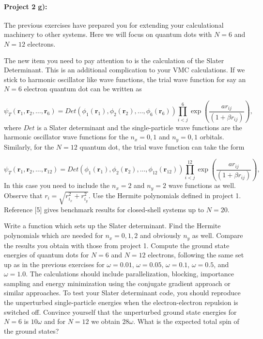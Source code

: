 \documentclass[%
oneside,                 %
final,                   %
10pt]{article}
\begin{document}
\paragraph{Project 2 g):}
The previous exercises have prepared you for extending your calculational machinery  to other systems.
Here we will focus on quantum dots with $N=6$ and $N=12$ electrons.

The new item you need to pay attention to is the calculation of the Slater Determinant. This is an additional complication
to your VMC calculations.  
If we stick to harmonic oscillator like wave functions,
the trial wave function for say an $N=6$ electron quantum dot can be written as

\begin{equation}
   \psi_{T}(\bm{r}_1,\bm{r}_2,\dots, \bm{r}_6) = 
   Det\left(\phi_{1}(\bm{r}_1),\phi_{2}(\bm{r}_2),
   \dots,\phi_{6}(\bm{r}_6)\right)
   \prod_{i<j}^{6}\exp{\left(\frac{a r_{ij}}{(1+\beta r_{ij})}\right)}, 
\end{equation}
where $Det$ is a Slater determinant and the single-particle wave functions
are the harmonic oscillator wave functions for the $n_x=0,1$ and $n_y=0,1$ orbitals. 
Similarly, for the $N=12$ quantum dot, the trial wave function can take the form

\begin{equation}
   \psi_{T}(\bm{r}_1,\bm{r}_2, \dots,\bm{r}_{12}) = 
   Det\left(\phi_{1}(\bm{r}_1),\phi_{2}(\bm{r}_2),
   \dots,\phi_{12}(\bm{r}_{12})\right)
   \prod_{i<j}^{12}\exp{\left(\frac{ar_{ij}}{(1+\beta r_{ij})}\right)}, 
\end{equation}
In this case you need to include the $n_x=2$ and $n_y=2$ wave functions as well.
Observe that $r_i = \sqrt{r_{i_x}^2+r_{i_y}^2}$.  Use the Hermite polynomials defined in project 1. Reference [5] gives benchmark results for closed-shell systems up to $N=20$. 

Write a function which sets up the Slater determinant. Find the Hermite polynomials which are needed for $n_x=0,1,2$ and obviously $n_y$ as well.  Compare the results you obtain with those from project 1.
Compute the ground state energies of quantum dots for $N=6$ and $N=12$ electrons, following the same set up as in the previous exercises for $\omega=0.01$, $\omega=0.05$,
$\omega=0.1$, $\omega=0.5$, and $\omega=1.0$.
The calculations should include  parallelization, blocking, importance sampling and energy minimization using the conjugate gradient approach or similar approaches.
To test your Slater determinant code, you should reproduce the unperturbed single-particle energies
when the electron-electron repulsion is switched off. Convince yourself that the unperturbed ground state energies for $N=6$ is $10\omega$ and for $N=12$ we obtain $28\omega$. What is the expected total 
spin of the ground states?
\end{document}
